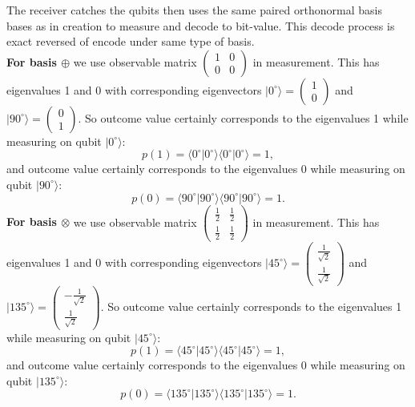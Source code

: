 \documentclass[12pt]{article}
\begin{document}
The receiver catches the qubits then uses the same paired orthonormal basis bases as in creation to measure and decode to bit-value. This decode process is exact reversed of encode under same type of basis. \\
\textbf{For basis $\oplus$} we use observable matrix 
$\begin{pmatrix}
1&0\\ 0&0
\end{pmatrix}$ in measurement. This has eigenvalues 1 and 0 with corresponding eigenvectors $|0^{\circ}\rangle=\begin{pmatrix}
1\\0
\end{pmatrix}$ and $
|90^{\circ}\rangle=\begin{pmatrix}
0\\1
\end{pmatrix}.$ So outcome value certainly corresponds to the eigenvalues 1 while measuring on qubit $|0^\circ\rangle$:
\[
	p(1)=\langle 0^\circ|0^\circ\rangle \langle0^\circ|0^\circ\rangle =1,
\]
and outcome value certainly corresponds to the eigenvalues 0 while measuring on qubit $|90^\circ\rangle$:
\[
	p(0)=\langle 90^\circ|90^\circ\rangle \langle90^\circ|90^\circ\rangle =1.
\]
\textbf{For basis $\otimes$} we use observable matrix
$\begin{pmatrix}
\frac{1}{2}&\frac{1}{2}\\ \frac{1}{2}&\frac{1}{2}
\end{pmatrix}$ in measurement. This has eigenvalues 1 and 0 with corresponding eigenvectors $|45^{\circ}\rangle=\begin{pmatrix}
\frac{1}{\sqrt{2}}\\ \frac{1}{\sqrt{2}}
\end{pmatrix}$ and $
|135^{\circ}\rangle=\begin{pmatrix}
-\frac{1}{\sqrt{2}}\\\frac{1}{\sqrt{2}}
\end{pmatrix}.$ So outcome value certainly corresponds to the eigenvalues 1 while measuring on qubit $|45^\circ\rangle$:
\[
	p(1)=\langle 45^\circ|45^\circ\rangle \langle45^\circ|45^\circ\rangle =1,
\]
and outcome value certainly corresponds to the eigenvalues 0 while measuring on qubit $|135^\circ\rangle$:
\[
	p(0)=\langle 135^\circ|135^\circ\rangle \langle135^\circ|135^\circ\rangle =1.
\]
\end{document}
